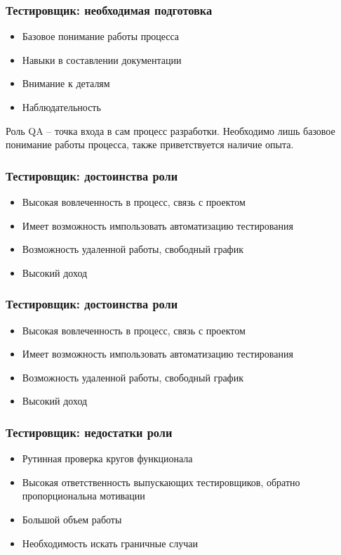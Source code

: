 \documentclass{../industrial-development}
\begin{document}
	\begin{frame} \frametitle{Тестировщик: необходимая подготовка}
		\begin{itemize}
			\item Базовое понимание работы процесса
			\item Навыки в составлении документации
			\item Внимание к деталям
			\item Наблюдательность 
		\end{itemize}
		\begin{block}{}
			\alert {}Роль QA – точка входа в сам процесс разработки. Необходимо лишь базовое понимание работы процесса, также приветствуется наличие опыта. 
		\end{block}
		
	\end{frame}
	
	\begin{frame} \frametitle{Тестировщик: достоинства роли}
		\begin{itemize}
			\item Высокая вовлеченность в процесс, связь с проектом
			\item Имеет возможность импользовать автоматизацию тестирования
			\item Возможность удаленной работы, свободный график
			\item Высокий доход
		\end{itemize}
	\end{frame}
	
	\begin{frame} \frametitle{Тестировщик: достоинства роли}
		\begin{itemize}
			\item Высокая вовлеченность в процесс, связь с проектом
			\item Имеет возможность импользовать автоматизацию тестирования
			\item Возможность удаленной работы, свободный график
			\item Высокий доход
		\end{itemize}
	\end{frame}
	
	\begin{frame} \frametitle{Тестировщик: недостатки роли}
		\begin{itemize}
			\item Рутинная проверка кругов функционала
			\item Высокая ответственность выпускающих тестировщиков, обратно пропорциональна мотивации
			\item Большой объем работы
			\item Необходимость искать граничные случаи
		\end{itemize}
	\end{frame}
	
\end{document}

